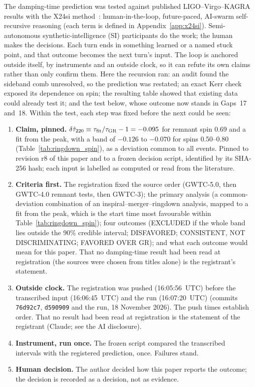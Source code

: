 \documentclass[11pt,a4paper]{article}
\begin{document}
The damping-time prediction was tested against published LIGO--Virgo--KAGRA results
with the X24si method~\cite{BresslerX24si2026}: human-in-the-loop, future-paced,
AI-swarm self-recursive reasoning (each term is defined in Appendix~\ref{app:x24si}). Semi-autonomous synthetic-intelligence (SI) participants do the work; the
human makes the decisions. Each turn ends in something learned or a named stuck point,
and that outcome becomes the next turn's input. The loop is anchored outside itself, by
instruments and an outside clock, so it can refute its own claims rather than only
confirm them. Here the recursion ran: an audit found the sideband comb unresolved, so
the prediction was restated; an exact Kerr check exposed its dependence on spin; the
resulting table showed that existing data could already test it; and the test below,
whose outcome now stands in Gaps~17 and~18. Within the test, each step was fixed before
the next could be seen:
\begin{enumerate}[leftmargin=*, label=\arabic*.]
  \item \textbf{Claim, pinned.} $\delta\hat\tau_{220} \equiv \tau_{\rm fit}/\tau_{\rm GR} - 1
    = -0.095$ for remnant spin 0.69 and a fit from the peak, with a band of $-0.126$ to
    $-0.070$ for spins 0.50--0.80 (Table~\ref{tab:ringdown_spin}), as a deviation common to
    all events. Pinned to revision r8 of this paper and to a frozen decision script,
    identified by its SHA-256 hash; each input is labelled as computed or read from the
    literature.
  \item \textbf{Criteria first.} The registration fixed the source order (GWTC-5.0,
    then GWTC-4.0 remnant tests, then GWTC-3); the primary analysis (a common-deviation
    combination of an inspiral--merger--ringdown analysis, mapped to a fit from the peak,
    which is the start time most favourable within Table~\ref{tab:ringdown_spin}); four outcomes (EXCLUDED if the
    whole band lies outside the 90\% credible interval; DISFAVORED; CONSISTENT, NOT
    DISCRIMINATING; FAVORED OVER GR); and what each outcome would mean for this paper.
    That no damping-time result had been read at registration (the sources
    were chosen from titles alone) is the registrant's statement.
  \item \textbf{Outside clock.} The registration was pushed (16:05:56~UTC) before the transcribed input (16:06:45~UTC) and the run (16:07:20~UTC)
    (commits \texttt{76d92c7}, \texttt{d590909} and the run, 18 November 2026). The push times establish order. That no result had been read at registration is the statement of the registrant (Claude; see the AI disclosure).
  \item \textbf{Instrument, run once.} The frozen script compared the transcribed
    intervals with the registered prediction, once. Failures stand.
  \item \textbf{Human decision.} The author decided how this paper reports the outcome;
    the decision is recorded as a decision, not as evidence.
\end{enumerate}
\end{document}
